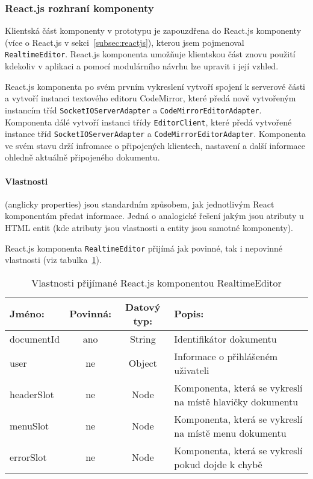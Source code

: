 
\subsubsection{React.js rozhraní komponenty}

Klientská část komponenty v prototypu je zapouzdřena do React.js komponenty (více o React.js v sekci~\ref{subsec:reactjs}), kterou jsem pojmenoval \texttt{RealtimeEditor}.
React.js komponenta umožňuje klientskou část znovu použití kdekoliv v aplikaci a pomocí modulárního návrhu lze upravit i její vzhled.

React.js komponenta po svém prvním vykreslení vytvoří spojení k serverové části a vytvoří instanci textového editoru CodeMirror, které předá nově vytvořeným instancím tříd \texttt{SocketIOServerAdapter} a \texttt{CodeMirrorEditorAdapter}.
Komponenta dálé vytvoří instanci třídy \texttt{EditorClient}, které předá vytvořené instance tříd \texttt{SocketIOServerAdapter} a \texttt{CodeMirrorEditorAdapter}.
Komponenta ve svém stavu drží infromace o připojených klientech, nastavení a další informace ohledně aktuálně připojeného dokumentu.

\paragraph{Vlastnosti} (anglicky properties) jsou standardním způsobem, jak jednotlivým React komponentám předat informace.
Jedná o analogické řešení jakým jsou atributy u \gls{HTML} entit (kde atributy jsou vlastnosti a entity jsou samotné komponenty).

React.js komponenta \texttt{RealtimeEditor} přijímá jak povinné, tak i nepovinné vlastnosti (viz tabulka~\ref{tab:reactKomponenta}).

\begin{table}[ht!]\centering
\caption{Vlastnosti přijímané React.js komponentou RealtimeEditor}\label{tab:reactKomponenta}

\begin{tabular}{l c c p{5.5cm}}
    Jméno: & Povinná: & Datový typ: & Popis:\\ \hline
    documentId & ano & String & Identifikátor dokumentu\\ \hline
    user & ne & Object & Informace o přihlášeném uživateli\\ \hline
    headerSlot & ne & Node & Komponenta, která se vykreslí na místě hlavičky dokumentu \\ \hline
    menuSlot & ne & Node & Komponenta, která se vykreslí na místě menu dokumentu \\ \hline
    errorSlot & ne & Node & Komponenta, která se vykreslí pokud dojde k chybě \\
\end{tabular}
\end{table}


